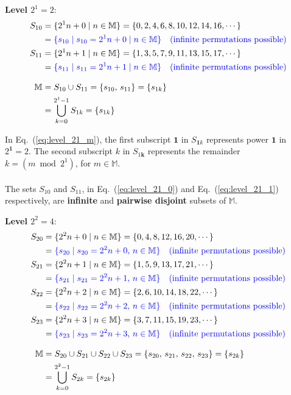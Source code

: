 \documentclass[12pt]{article}
\theoremstyle{definition} %
\numberwithin{equation}{section}
\newcommand{\eqrefc}[1]{Eq.~(\ref{eq:#1})}
\begin{document}
\vspace{1em}
\textbf{Level \(2^1=2\)}:
\begin{align}
S_{10} &= \{2^1n + 0 \mid n \in \mathbb{M}\} = \{0, 2, 4, 6, 8, 10, 12, 14, 16, \cdots\} \label{eq:level_21_0} \\
&= \textcolor{blue}{\{s_{10} \mid s_{10} = 2^1n+0 \mid n \in \mathbb{M}\}} \quad \textcolor{blue}{\text{(infinite permutations possible)}}  \\
S_{11} &= \{2^1n + 1 \mid n \in \mathbb{M}\} = \{1, 3, 5, 7, 9, 11, 13, 15, 17, \cdots\} \label{eq:level_21_1} \\
&= \textcolor{blue}{\{s_{11} \mid s_{11} = 2^1n+1 \mid n \in \mathbb{M}\}} \quad \textcolor{blue}{\text{(infinite permutations possible)}} \\[2ex]
\mathbb{M} &= S_{10} \cup S_{11} = \{s_{10},\,s_{11}\} = \{ s_{1k} \}\\
&= \bigcup_{k=0}^{2^1-1}S_{1k} = \{ s_{1k} \} \label{eq:level_21_m}
\end{align}

In \eqrefc{level_21_m}, the first subscript \(\bm{1}\) 
in \(S_{\bm{1}k} \) represents power
\(\bm{1}\) in \(2^{\bm{1}}=2\). The second subscript \(k\) in \(S_{1\bm{k}} \) represents the remainder \(k = (m \bmod 2^1)\), for \(m \in \mathbb{M}\).\\
\\
The sets \(S_{10}\) and \(S_{11}\), in \eqrefc{level_21_0} and \eqrefc{level_21_1} respectively, are \textbf{infinite} and \textbf{pairwise disjoint} subsets of \(\mathbb{M}\). 

\vspace{1em}
\textbf{Level \(2^2=4\)}:
\begin{align}
S_{20} &= \{2^2n + 0 \mid n \in \mathbb{M}\} = \{0, 4,  8, 12, 16, 20,\cdots\} \label{eq:level_22_0}\\
&= \textcolor{blue}{\{s_{20} \mid s_{20} = 2^2n + 0,\,n \in \mathbb{M}\}} \quad \textcolor{blue}{\text{(infinite permutations possible)}}\\
S_{21} &= \{2^2n + 1 \mid n \in \mathbb{M}\} = \{1, 5,  9, 13, 17, 21,\cdots\} \\
&= \textcolor{blue}{\{s_{21} \mid s_{21} = 2^2n + 1,\,n \in \mathbb{M}\}} \quad \textcolor{blue}{\text{(infinite permutations possible)}}\\
S_{22} &= \{2^2n + 2 \mid n\in \mathbb{M}\} = \{2, 6, 10, 14, 18, 22,\cdots\} \\
&= \textcolor{blue}{\{s_{22} \mid s_{22} = 2^2n + 2,\,n \in \mathbb{M}\}} \quad \textcolor{blue}{\text{(infinite permutations possible)}}\\
S_{23} &= \{2^2n + 3 \mid n \in \mathbb{M}\} = \{3, 7, 11, 15, 19, 23,\cdots\} \label{eq:level_22_3}\\
&= \textcolor{blue}{\{s_{23} \mid s_{23} = 2^2n + 3,\,n \in \mathbb{M}\}} \quad \textcolor{blue}{\text{(infinite permutations possible)}}\\[2ex]
\mathbb{M} &= S_{20} \cup S_{21}\cup S_{22}\cup S_{23} =\{s_{20},\, s_{21},\, s_{22},\, s_{23}\} = \{ s_{2k} \} \\
&= \bigcup_{k=0}^{2^2-1}S_{2k} = \{ s_{2k} \} \label{eq:level_22_m}
\end{align}
\end{document}
